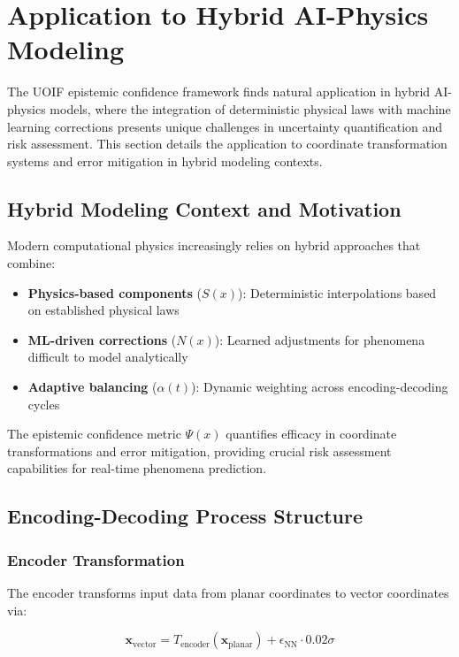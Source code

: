 \section{Application to Hybrid AI-Physics Modeling}

The UOIF epistemic confidence framework finds natural application in hybrid AI-physics models, where the integration of deterministic physical laws with machine learning corrections presents unique challenges in uncertainty quantification and risk assessment. This section details the application to coordinate transformation systems and error mitigation in hybrid modeling contexts.

\subsection{Hybrid Modeling Context and Motivation}

Modern computational physics increasingly relies on hybrid approaches that combine:
\begin{itemize}
    \item \textbf{Physics-based components} ($S(x)$): Deterministic interpolations based on established physical laws
    \item \textbf{ML-driven corrections} ($N(x)$): Learned adjustments for phenomena difficult to model analytically
    \item \textbf{Adaptive balancing} ($\alpha(t)$): Dynamic weighting across encoding-decoding cycles
\end{itemize}

The epistemic confidence metric $\Psi(x)$ quantifies efficacy in coordinate transformations and error mitigation, providing crucial risk assessment capabilities for real-time phenomena prediction.

\subsection{Encoding-Decoding Process Structure}

\subsubsection{Encoder Transformation}

The encoder transforms input data from planar coordinates to vector coordinates via:

\begin{equation}
\mathbf{x}_{\text{vector}} = T_{\text{encoder}}(\mathbf{x}_{\text{planar}}) + \epsilon_{\text{NN}} \cdot 0.02\sigma
\end{equation}

